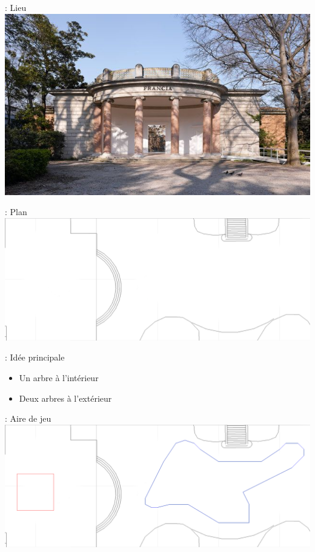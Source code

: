 \documentclass[12pt]{beamer}
\begin{document}
            \begin{frame}{\subsecname: Lieu}
                \includegraphics[width=\linewidth]{img/pavillon.jpg}
            \end{frame}
            \begin{frame}{\subsecname: Plan}
                \includegraphics[width=\linewidth]{img/plan.png}
            \end{frame}
            \begin{frame}{\subsecname: Idée principale}
                \begin{itemize}
                    \item Un arbre à l’intérieur
                    \item Deux arbres à l’extérieur
                \end{itemize}
            \end{frame}
            \begin{frame}{\subsecname: Aire de jeu}
                \includegraphics[width=\linewidth]{img/plan_bords.png}
            \end{frame}
\end{document}
